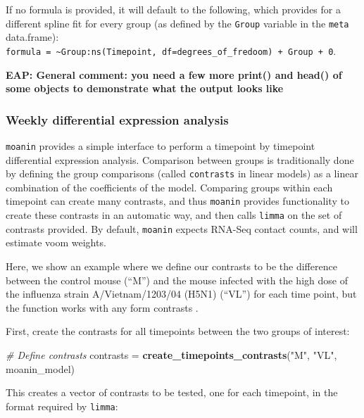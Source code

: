 \documentclass[9pt,a4paper,]{extarticle}
\newenvironment{Shaded}{\begin{snugshade}}{\end{snugshade}}
\newcommand{\CommentTok}[1]{\textcolor[rgb]{0.56,0.35,0.01}{\textit{#1}}}
\newcommand{\KeywordTok}[1]{\textcolor[rgb]{0.13,0.29,0.53}{\textbf{#1}}}
\newcommand{\NormalTok}[1]{#1}
\newcommand{\StringTok}[1]{\textcolor[rgb]{0.31,0.60,0.02}{#1}}
\begin{document}
If no formula is provided, it will default to the following, which provides
for a different spline fit for every group (as defined by the \texttt{Group} variable
in the \texttt{meta} data.frame):
\texttt{formula\ =\ \textasciitilde{}Group:ns(Timepoint,\ df=degrees\_of\_fredoom)\ +\ Group\ +\ 0}.

\textbf{EAP: General comment: you need a few more print() and head() of some objects
to demonstrate what the output looks like}

\hypertarget{weekly-differential-expression-analysis}{%
\subsubsection{Weekly differential expression analysis}\label{weekly-differential-expression-analysis}}

\texttt{moanin} provides a simple interface to perform a timepoint by timepoint
differential expression analysis. Comparison between groups is traditionally
done by defining the group comparisons (called \texttt{contrasts} in linear models)
as a linear combination of the coefficients of the model. Comparing groups
within each timepoint can create many contrasts, and thus \texttt{moanin} provides
functionality to create these contrasts in an automatic way, and then calls
\texttt{limma} \citep{ritchie:limma} on the set of contrasts provided. By default,
\texttt{moanin} expects RNA-Seq contact counts, and will estimate voom weights.

Here, we show an example where we define our contrasts to be the difference
between the control mouse (``M'') and the mouse infected with the high dose of
the influenza strain A/Vietnam/1203/04 (H5N1) (``VL'') for each time point, but
the function works with any form contrasts \citep{ritchie:limma}.

First, create the contrasts for all timepoints between the two groups of
interest:

\begin{Shaded}
\begin{Highlighting}[]
\CommentTok{# Define contrasts  }
\NormalTok{contrasts =}\StringTok{ }\KeywordTok{create_timepoints_contrasts}\NormalTok{(}\StringTok{"M"}\NormalTok{, }\StringTok{"VL"}\NormalTok{, moanin_model)}
\end{Highlighting}
\end{Shaded}

This creates a vector of contrasts to be tested, one for each timepoint, in the format required by \texttt{limma}:
\end{document}
